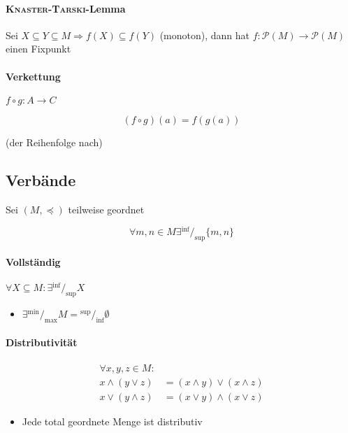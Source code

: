 \paragraph{\textsc{Knaster-Tarski}-Lemma}

Sei $X \subseteq Y \subseteq M \Rightarrow f(X) \subseteq f(Y)$ (monoton), dann hat $f: \mathcal{P}(M) \rightarrow \mathcal{P}(M)$ einen Fixpunkt

\paragraph{Verkettung} $f \circ g: A \rightarrow C$

$$(f \circ g) (a) = f(g(a))$$

(der Reihenfolge nach)


\subsection{Verbände}

Sei $(M, \preceq)$ teilweise geordnet

$$\forall m, n \in M \exists {}^{\inf}/_{\sup} \{m, n\}$$

\paragraph{Vollständig} $\forall X \subseteq M: \exists {}^{\inf}/_{\sup} X$

\begin{itemize}
  \item $\exists {}^{\min}/_{\max} M = {}^{\sup}/_{\inf} \emptyset$
\end{itemize}

\paragraph{Distributivität}

\begin{align*}
  \forall x, y, z \in M:                              \\
  x \land (y \lor z) & = (x \land y) \lor (x \land z) \\
  x \lor (y \land z) & = (x \lor y) \land (x \lor z)
\end{align*}

\begin{itemize}
  \item Jede total geordnete Menge ist distributiv
\end{itemize}